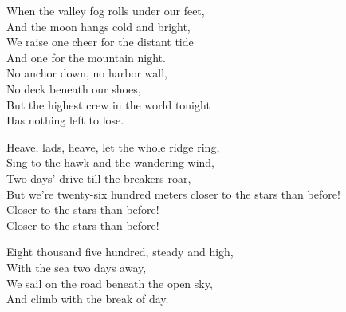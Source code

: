 \begin{lyrics}
When the valley fog rolls under our feet,\\
And the moon hangs cold and bright,\\
We raise one cheer for the distant tide\\
And one for the mountain night.\\
No anchor down, no harbor wall,\\
No deck beneath our shoes,\\
But the highest crew in the world tonight\\
Has nothing left to lose.

Heave, lads, heave, let the whole ridge ring,\\
Sing to the hawk and the wandering wind,\\
Two days' drive till the breakers roar,\\
But we're twenty-six hundred meters closer to the stars than before!\\
Closer to the stars than before!\\
Closer to the stars than before!

Eight thousand five hundred, steady and high,\\
With the sea two days away,\\
We sail on the road beneath the open sky,\\
And climb with the break of day.
\end{lyrics}
